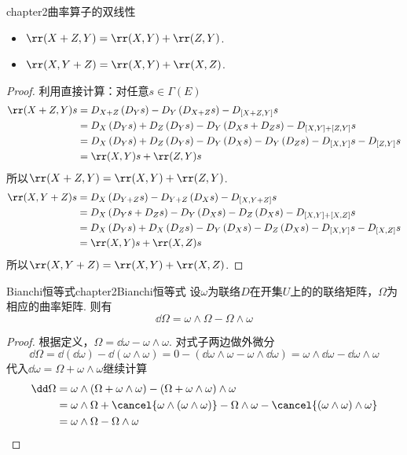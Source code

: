 \begin{mythm}{}{chapter2曲率算子的双线性}
	\begin{itemize}
		\item[(1)] $\rr(X+Z,Y)=\rr(X,Y)+\rr(Z,Y)$.
		\item[(2)] $\rr(X,Y+Z)=\rr(X,Y)+\rr(X,Z)$.
	\end{itemize}
\end{mythm}
\begin{proof}
	利用直接计算：对任意$s\in \Gamma(E)$
	\[
	\begin{split}
	\rr(X+Z,Y)s&=D_{X+Z}\left(D_{Y}s\right)-D_{Y}\left(D_{X+Z}s\right)-D_{[X+Z,Y]}s\\
	&=D_{X}\left(D_{Y}s\right)+D_{Z}\left(D_{Y}s\right)-D_{Y}\left( D_{X}s+D_{Z}s\right)-D_{[X,Y]+[Z,Y]}s\\
	&=D_{X}\left(D_{Y}s \right)+D_{Z}\left(D_{Y}s \right)-D_{Y}\left(D_{X}s \right)-D_{Y}\left(D_{Z}s \right)-D_{[X,Y]}s-D_{[Z,Y]}s\\
	&=\rr(X,Y)s+\rr(Z,Y)s
	\end{split}
	\]
	所以$\rr(X+Z,Y)=\rr(X,Y)+\rr(Z,Y)$.
	\[
	\begin{split}
	\rr(X,Y+Z)s&=D_{X}\left(D_{Y+Z}s\right)-D_{Y+Z}\left(D_{X}s\right)-D_{[X,Y+Z]}s\\
	&=D_{X}\left(D_{Y}s+D_{Z}s\right)-D_{Y}\left(D_{X}s\right)-D_{Z}\left( D_{X}s \right)-D_{[X,Y]+[X,Z]}s\\
	&=D_{X}\left(D_{Y}s \right)+D_{X}\left(D_{Z}s \right)-D_{Y}\left(D_{X}s \right)-D_{Z}\left(D_{X}s \right)-D_{[X,Y]}s-D_{[X,Z]}s\\
	&=\rr(X,Y)s+\rr(X,Z)s
	\end{split}
	\]
	所以$\rr(X,Y+Z)=\rr(X,Y)+\rr(X,Z)$.
\end{proof}


\begin{mythm}{Bianchi恒等式}{chapter2Bianchi恒等式}
	设$\omega$为联络$D$在开集$U$上的的联络矩阵，$\Omega$为相应的曲率矩阵. 则有
	\[
	\dd \Omega=\omega\wedge\Omega-\Omega\wedge\omega
	\]
\end{mythm}
\begin{proof}
	根据定义，$\Omega=\dd \omega-\omega\wedge\omega$. 对式子两边做外微分
	\[
	\dd \Omega=\dd(\dd \omega)-\dd (\omega\wedge\omega)=0-(\dd\omega\wedge\omega-\omega\wedge\dd\omega)=\omega\wedge\dd\omega-\dd\omega\wedge\omega
	\]
	代入$\dd \omega=\Omega+\omega\wedge\omega$继续计算
	\[
	\begin{split}
	\dd \Omega&=\omega\wedge(\Omega+\omega\wedge\omega)-(\Omega+\omega\wedge\omega)\wedge\omega\\
	&=\omega\wedge\Omega+\cancel{\omega\wedge(\omega\wedge\omega)}-\Omega\wedge\omega-\cancel{(\omega\wedge\omega)\wedge\omega}\\
	&=\omega\wedge\Omega-\Omega\wedge\omega
	\end{split}
	\]
\end{proof}

